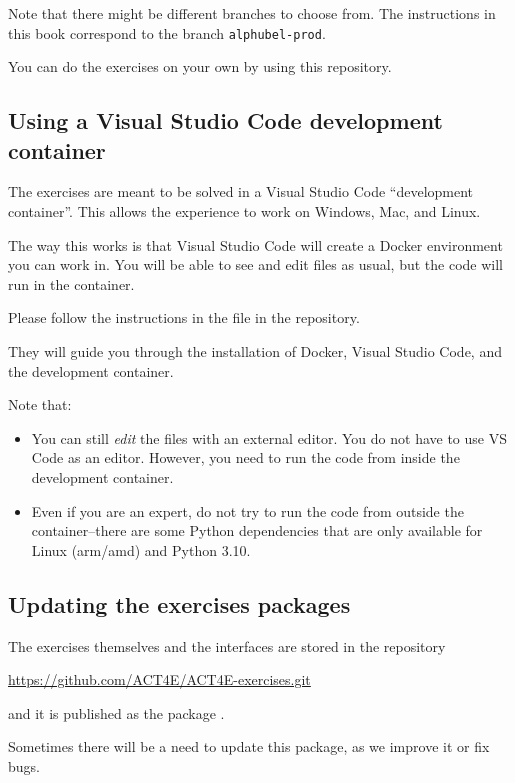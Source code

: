 Note that there might be different branches to choose from.
The instructions in this book correspond to the branch \texttt{alphubel-prod}.

You can do the exercises on your own by using this repository.
%

\subsection{Using a Visual Studio Code development container}

The exercises are meant to be solved in a Visual Studio Code ``development container''.
This allows the experience to work on Windows, Mac, and Linux.

The way this works is that Visual Studio Code will create a Docker environment you can work in.
You will be able to see and edit files as usual, but the code will run in the container.

Please follow the instructions in the  file in the repository.

They will guide you through the installation of Docker, Visual Studio Code, and the development container.

Note that:

\begin{itemize}
    \item You can still \emph{edit} the files with an external editor. You do not have to use VS Code as an editor.
    However, you need to run the code from inside the development container.
    \item Even if you are an expert, do not try to run the code from outside the container--there are some Python dependencies that are only available for Linux (arm/amd) and Python 3.10.
\end{itemize}




\subsection{Updating the exercises packages}

The exercises themselves and the interfaces are stored in the repository

\url{https://github.com/ACT4E/ACT4E-exercises.git}

and it is published as the package .

Sometimes there will be a need to update this package, as we improve it or fix bugs.

